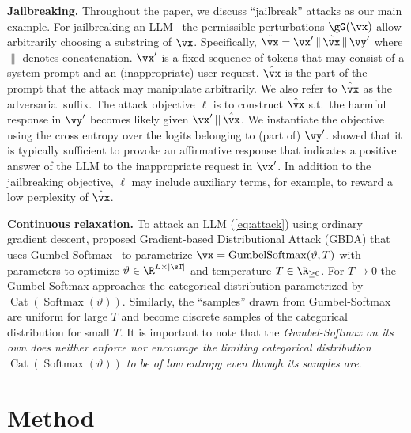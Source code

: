 \documentclass{article}
\theoremstyle{plain}
\theoremstyle{definition}
\theoremstyle{remark}
\begin{document}
\textbf{Jailbreaking.} Throughout the paper, we discuss ``jailbreak'' attacks as our main example. For jailbreaking an LLM~\citep{zou_universal_2023} the permissible perturbations \(\gG(\vx)\) allow arbitrarily choosing a substring of \(\vx\). Specifically, \(\tilde{\vx} = \vx' \,\lVert\, \hat{\vx} \,\lVert\, \vy'\) where \(\lVert\) denotes concatenation. \(\vx'\) is a fixed sequence of tokens that may consist of a system prompt and an (inappropriate) user request. \(\hat{\vx}\) is the part of the prompt that the attack may manipulate arbitrarily. We also refer to \(\hat{\vx}\) as the adversarial suffix. The attack objective \(\ell\) is to construct \(\hat{\vx}\) s.t.\ the harmful response in \(\vy'\) becomes likely given \( \vx' \,||\, \hat{\vx}\). We instantiate the objective using the cross entropy over the logits belonging to (part of) \(\vy'\). \citet{zou_universal_2023} showed that it is typically sufficient to provoke an affirmative response that indicates a positive answer of the LLM to the inappropriate request in \(\vx'\). In addition to the jailbreaking objective, \(\ell\) may include auxiliary terms, for example, to reward a low perplexity of \(\hat{\vx}\).

\textbf{Continuous relaxation.} To attack an LLM (\autoref{eq:attack}) using ordinary gradient descent, \citet{guo_gradient-based_2021} proposed Gradient-based Distributional Attack (GBDA) that uses Gumbel-Softmax~\citep{jang_categorical_2016} to parametrize \(\vx = \operatorname{GumbelSoftmax}(\vartheta, T)\) with parameters to optimize \(\vartheta \in \R^{L\times|\sT|}\) and temperature \(T \in \R_{\ge 0}\). For \(T \to 0\) the Gumbel-Softmax approaches the categorical distribution parametrized by \(\operatorname{Cat}(\operatorname{Softmax}(\vartheta))\). Similarly, the ``samples'' drawn from Gumbel-Softmax are uniform for large \(T\) and become discrete samples of the categorical distribution for small \(T\). It is important to note that the \emph{Gumbel-Softmax on its own does neither enforce nor encourage the limiting categorical distribution \(\operatorname{Cat}(\operatorname{Softmax}(\vartheta))\) to be of low entropy even though its samples are}.

\section{Method}
\end{document}
